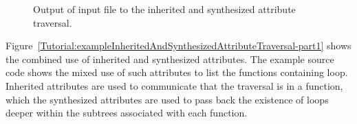 
\begin{figure}[!h]
{\indent
{\mySmallFontSize

\begin{latexonly}
   
\end{latexonly}

\begin{htmlonly}
   
\end{htmlonly}

}
}
\caption{Output of input file to the inherited and synthesized attribute traversal.}
\label{Tutorial:exampleOutput_InheritedAndSynthesizedAttributeTraversal}
\end{figure}

   Figure~\ref{Tutorial:exampleInheritedAndSynthesizedAttributeTraversal-part1}
shows the combined use of inherited and synthesized attributes.  The example
source code shows the mixed use of such attributes to list the functions 
containing loop.  Inherited attributes are used to communicate that 
the traversal is in a function, which the synthesized attributes are
used to pass back the existence of loops deeper within the subtrees
associated with each function.

